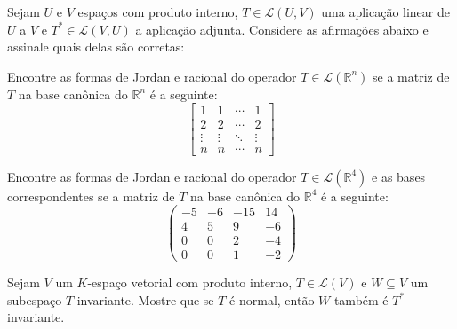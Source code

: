 \documentclass[11pt,a4paper]{article}
\begin{document}
\begin{exercicio}
Sejam $U$ e $V$ espaços com produto interno, $T \in \mathcal{L}(U,V)$ uma aplicação linear de $U$ a $V$ e $T^{*} \in \mathcal{L}(V,U)$ a aplicação adjunta. Considere as afirmações abaixo e assinale quais delas são corretas:
\end{exercicio}
\begin{exercicio}
Encontre as formas de Jordan e racional do operador $T \in \mathcal{L}(\mathbb{R}^n)$ se a matriz de $T$ na base canônica do $\mathbb{R}^n$ é a seguinte:
\[
\begin{bmatrix}
1 & 1 & \cdots & 1 \\
2 & 2 & \cdots & 2 \\
\vdots & \vdots & \ddots & \vdots \\
n & n & \cdots & n
\end{bmatrix}
\]
\end{exercicio}
\solucao{
}
\begin{exercicio}
Encontre as formas de Jordan e racional do operador $T \in \mathcal{L}(\mathbb{R}^4)$ e as bases correspondentes se a matriz de $T$ na base canônica do $\mathbb{R}^4$ é a seguinte:
\[
\begin{pmatrix}
-5 & -6 & -15 & 14 \\
4 & 5 & 9 & -6 \\
0 & 0 & 2 & -4 \\
0 & 0 & 1 & -2
\end{pmatrix}
\]
\end{exercicio}
\solucao{}
\begin{exercicio}
Sejam $V$ um $K$-espaço vetorial com produto interno, $T \in \mathcal{L}(V)$ e $W \subseteq V$ um subespaço $T$-invariante. Mostre que se $T$ é normal, então $W$ também é $T^{*}$-invariante.
\end{exercicio}
\solucao{}
\end{document}
